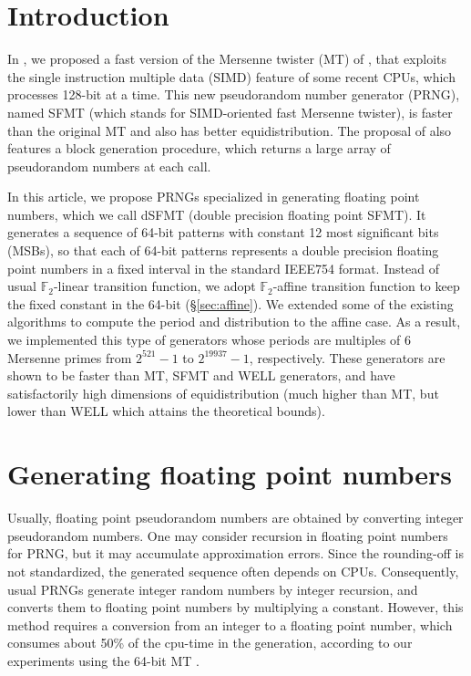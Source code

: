 \documentclass{svmult}
\begin{document}
\section {Introduction}
\label{sec:intro}

In \cite{SFMT}, we proposed a fast version of the Mersenne twister (MT) of \cite{MT},
that exploits the single instruction multiple data \cite{wiki:SIMD} (SIMD) feature of some
recent CPUs, which processes 128-bit at a time. 
This new pseudorandom number generator (PRNG), named SFMT (which stands for SIMD-oriented
fast Mersenne twister), is faster than the original MT and also has better
equidistribution. The proposal of \cite{SFMT} also features a block generation
procedure, which returns a large array of pseudorandom numbers at
each call.


In this article, we propose PRNGs
specialized in generating floating point numbers, which 
we call dSFMT (double precision floating point SFMT).
It generates a sequence of 64-bit patterns with constant 
12 most significant bits (MSBs), so that each of 64-bit patterns
represents a double precision floating point numbers in a fixed 
interval in the standard IEEE754 format.
Instead of usual ${\mathbb F}_2$-linear transition function, 
we adopt ${\mathbb F}_2$-affine transition function to keep the
fixed constant in the 64-bit (\S\ref{sec:affine}). We extended
some of the existing algorithms to compute the period and distribution 
to the affine case. 
As a result, we implemented this type of generators whose periods 
are multiples of 
6 Mersenne primes from $2^{521}-1$ to $2^{19937}-1$, respectively.
These generators are shown to be faster than MT, SFMT and WELL generators,
and have satisfactorily high dimensions of equidistribution 
(much higher than MT, but lower than WELL which attains the theoretical bounds).


\section{Generating floating point numbers}
\label{sec:floating}\label{sec:ieee}

Usually, floating point pseudorandom numbers are obtained by
converting integer pseudorandom numbers. 
One may consider recursion in floating
point numbers for PRNG, but it may accumulate approximation errors.
Since the rounding-off is not standardized, the generated
sequence often depends on CPUs. 
Consequently, usual PRNGs generate integer random numbers by integer recursion,
and converts them 
to floating point numbers by multiplying a constant.
However, this method requires a conversion from an integer to
a floating point number, which consumes about 50\% of the cpu-time
in the generation, according to our experiments using
the 64-bit MT \cite{MT64}.
\end{document}
